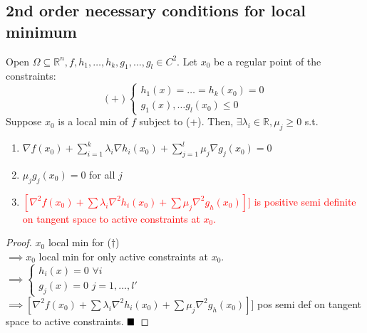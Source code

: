 \documentclass[11pt]{article}
\newcommand{\real}[0]{\mathbb{R}}
\newcommand{\qed}[0]{$\hfill\blacksquare$}
\begin{document}
\subsection{2nd order necessary conditions for local minimum}
Open $\Omega \subseteq \real^n, f, h_1, \hdots, h_k, g_1, \hdots, g_l \in C^2$.
Let $x_0$ be a regular point of the constraints:
$$(+)\begin{cases}
	h_1(x) = \hdots = h_k(x_0) = 0 \\
	g_1(x), \hdots g_l(x_0) \leq 0
\end{cases}$$
Suppose $x_0$ is a local min of $f$ subject to (+).
Then, $\exists \lambda_i \in \real, \mu_j \geq 0$ s.t.
\begin{enumerate}
	\item $\nabla f(x_0) + \sum_{i=1}^k \lambda_i \nabla h_i(x_0) + \sum_{j=1}^l \mu_j \nabla g_j(x_0) = 0$
	\item $\mu_j g_j(x_0) = 0 $ for all $j$
	\item \textcolor{red}{$[\nabla^2 f(x_0) + \sum \lambda_i \nabla^2h_i(x_0) + \sum \mu_j \nabla^2 g_h(x_0)]]$ is positive semi definite on tangent space to active constraints at $x_0$.}
\end{enumerate}
\begin{proof}
	$x_0$ local min for ($\dag$) \\
	$\implies x_0$ local min for only active constraints at $x_0$. \\
	$\implies \begin{cases}
		h_i(x) = 0 \,\, \forall i \\
		g_j(x) = 0 \,\, j=1, \hdots, l'
	\end{cases}$ \\
	$\implies [\nabla^2 f(x_0) + \sum \lambda_i \nabla^2h_i(x_0) + \sum \mu_j \nabla^2 g_h(x_0)]]$ pos semi def on tangent space to active constraints. \qed
\end{proof}
\end{document}
